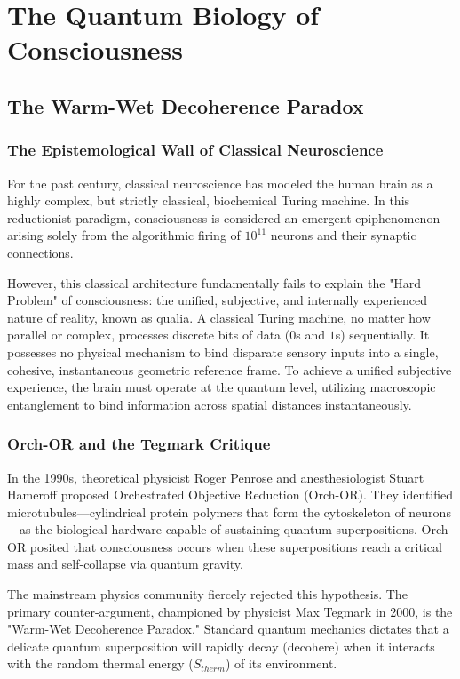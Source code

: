 \documentclass[12pt,openany]{book}
\begin{document}
\mainmatter

\part{The Quantum Biology of Consciousness}

\chapter{The Warm-Wet Decoherence Paradox}

\section{The Epistemological Wall of Classical Neuroscience}
For the past century, classical neuroscience has modeled the human brain as a highly complex, but strictly classical, biochemical Turing machine. In this reductionist paradigm, consciousness is considered an emergent epiphenomenon arising solely from the algorithmic firing of $10^{11}$ neurons and their synaptic connections. 

However, this classical architecture fundamentally fails to explain the "Hard Problem" of consciousness: the unified, subjective, and internally experienced nature of reality, known as qualia. A classical Turing machine, no matter how parallel or complex, processes discrete bits of data ($0$s and $1$s) sequentially. It possesses no physical mechanism to bind disparate sensory inputs into a single, cohesive, instantaneous geometric reference frame. To achieve a unified subjective experience, the brain must operate at the quantum level, utilizing macroscopic entanglement to bind information across spatial distances instantaneously.

\section{Orch-OR and the Tegmark Critique}
In the 1990s, theoretical physicist Roger Penrose and anesthesiologist Stuart Hameroff proposed Orchestrated Objective Reduction (Orch-OR). They identified microtubules---cylindrical protein polymers that form the cytoskeleton of neurons---as the biological hardware capable of sustaining quantum superpositions. Orch-OR posited that consciousness occurs when these superpositions reach a critical mass and self-collapse via quantum gravity.

The mainstream physics community fiercely rejected this hypothesis. The primary counter-argument, championed by physicist Max Tegmark in 2000, is the "Warm-Wet Decoherence Paradox." Standard quantum mechanics dictates that a delicate quantum superposition will rapidly decay (decohere) when it interacts with the random thermal energy ($S_{therm}$) of its environment. 
\end{document}
